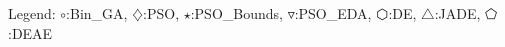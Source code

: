 Legend: {\color{NavyBlue}$\circ$}:Bin\_GA, {\color{Magenta}$\diamondsuit$}:PSO, {\color{Orange}$\star$}:PSO\_Bounds, {\color{CornflowerBlue}$\triangledown$}:PSO\_EDA, {\color{red}$\varhexagon$}:DE, {\color{YellowGreen}$\triangle$}:JADE, {\color{cyan}$\pentagon$}:DEAE